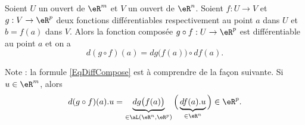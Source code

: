 \begin{proposition}		\label{PropDiffCompose}
Soient $U$ un ouvert de $\eR^m$ et $V$ un ouvert de $\eR^n$. Soient $f: U\to V$  et $g: V \to \eR^p$ deux fonctions différentiables respectivement au point $a$ dans $U$ et $b=f(a)$ dans $V$. Alors la fonction composée $g\circ f: U\to \eR^p $ est différentiable au point $a$ et on a 
\begin{equation}	\label{EqDiffCompose}
	d(g\circ f)(a)=dg\big(f(a)\big)\circ df(a).
\end{equation}
\end{proposition}

Note : la formule \eqref{EqDiffCompose} est à comprendre de la façon suivante. Si $u\in\eR^m$, alors
\begin{equation}
	d(g\circ f)(a).u=\underbrace{dg\big( f(a) \big)}_{\in\aL(\eR^n,\eR^p)}\Big( \underbrace{df(a).u}_{\in\eR^n} \Big)\in\eR^p.
\end{equation}

